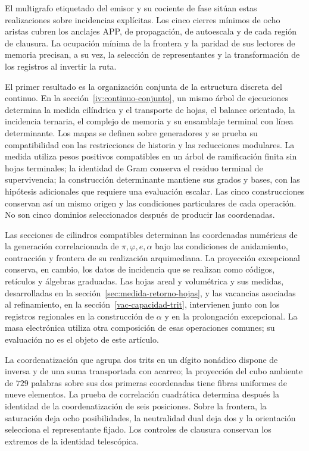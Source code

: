 El multigrafo etiquetado del emisor y su cociente de fase sitúan estas
realizaciones sobre incidencias explícitas. Los cinco cierres mínimos
de ocho aristas cubren los anclajes APP, de propagación, de autoescala
y de cada región de clausura. La ocupación mínima de la frontera y la
paridad de sus lectores de memoria precisan, a su vez, la selección de
representantes y la transformación de los registros al invertir la ruta.

El primer resultado es la organización conjunta de la estructura
discreta del continuo. En la sección~\ref{iv:continuo-conjunto}, un
mismo árbol de ejecuciones determina la medida cilíndrica y el transporte
de hojas, el balance orientado, la incidencia ternaria, el complejo
de memoria y su ensamblaje terminal con línea determinante. Los mapas
se definen sobre generadores y se prueba su compatibilidad con las
restricciones de historia y las reducciones modulares. La medida
utiliza pesos positivos compatibles en un árbol de ramificación finita
sin hojas terminales; la identidad de Gram conserva el residuo terminal
de supervivencia; la construcción determinante mantiene sus grados y
bases, con las hipótesis adicionales que requiere una evaluación
escalar. Las cinco construcciones conservan así un mismo origen y las
condiciones particulares de cada operación. No son cinco dominios
seleccionados después de producir las coordenadas.

Las secciones de cilindros compatibles determinan las coordenadas
numéricas de la generación correlacionada de \(\pi,\varphi,e,\alpha\)
bajo las condiciones de anidamiento, contracción y frontera
de su realización arquimediana. La proyección excepcional conserva,
en cambio, los datos de incidencia que se realizan como códigos,
retículos y álgebras graduadas. Las hojas areal y volumétrica y sus
medidas, desarrolladas en la sección~\ref{sec:medida-retorno-hojas},
y las vacancias asociadas al refinamiento, en la
sección~\ref{vac-capacidad-trit}, intervienen junto con los registros
regionales en la construcción de \(\alpha\) y en la prolongación
excepcional. La masa electrónica utiliza otra composición de esas
operaciones comunes; su evaluación no es el objeto de este artículo.

La coordenatización que agrupa dos trits en un dígito nonádico dispone de inversa
y de una suma transportada con acarreo; la proyección del cubo ambiente
de \(729\) palabras sobre sus dos primeras coordenadas tiene fibras
uniformes de nueve elementos. La prueba de correlación cuadrática
determina después la identidad de la coordenatización de seis posiciones.
Sobre la frontera, la saturación deja ocho posibilidades, la neutralidad
dual deja dos y la orientación selecciona el representante fijado.
Los controles de clausura conservan los extremos de la identidad
telescópica. 

